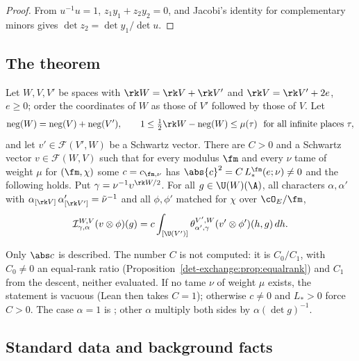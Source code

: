 \begin{proof}
From $u^{-1}u=1$, $z_1y_1+z_2y_2=0$, and Jacobi's identity for complementary minors gives
$\det z_2=\det y_1/\det u$.
\end{proof}

\subsection{The theorem}

\begin{theorem}
\label{det-exchange:thm:exchange}
Let $W,V,V'$ be spaces with $\rk W=\rk V+\rk V'$ and $\rk V=\rk V'+2e$, $e\ge0$; order the
coordinates of $W$ as those of $V'$ followed by those of $V$. Let
\[
  \operatorname{neg}(W)=\operatorname{neg}(V)+\operatorname{neg}(V'),\qquad
  1\le \tfrac12\rk W-\operatorname{neg}(W)\le\mu(\tau)\ \text{ for all infinite places }\tau,
\]
and let $v'\in\mathcal F(V',W)$ be a Schwartz vector. There are $C>0$ and a Schwartz vector
$v\in\mathcal F(W,V)$ such that for every modulus $\fm$ and every $\nu$ tame of weight $\mu$ for
$(\fm,\chi)$ some $c=c_{\fm,\nu}$ has $\abs{c}^2=C\,L_*^{\fm}(e;\nu)\ne0$ and the following holds.
Put $\gamma=\nu^{-1}\upsilon^{\rk W/2}$. For all $g\in\U(W)(\A)$, all characters $\alpha,\alpha'$ with
$\alpha_{[\rk V]}\,\alpha'_{[\rk V']}=\tilde\nu^{-1}$ and all $\phi,\phi'$ matched for $\chi$ over
$\cO_E/\fm$,
\begin{equation}\label{det-exchange:eq:exchange}
  \mathcal I^{W,V}_{\gamma,\alpha}(v\otimes\phi)(g)
  = c\int_{[\U(V')]}\theta^{V',W}_{\alpha',\gamma}(v'\otimes\phi')(h,g)\,dh .
\end{equation}
\end{theorem}

Only $\abs c$ is described. The number $C$ is
not computed: it is $C_0/C_1$, with $C_0\ne0$ an equal-rank ratio
(Proposition~\ref{det-exchange:prop:equalrank}) and $C_1$ from the descent, neither evaluated. If
no tame $\nu$ of weight $\mu$ exists, the statement is vacuous (Lean then takes $C=1$); otherwise
$c\ne0$ and $L_*>0$ force $C>0$. The case $\alpha=1$ is
; other $\alpha$ multiply both sides by $\alpha(\det g)^{-1}$.

\subsection{Standard data and background facts}


